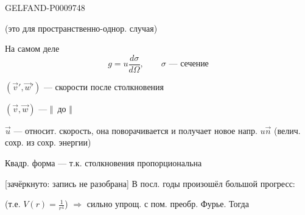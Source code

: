 \begin{GelfandAdjacentEvidence}{GELFAND-P000974}{8}


(это для пространственно-однор. случая)

На самом деле
\begin{equation*}
 g=u\frac{d\sigma}{d\Omega},\qquad
 \sigma\text{ --- сечение}
 \tag{4}
\end{equation*}

$(\vec v',\vec w')$ --- скорости после столкновения

$(\vec v,\vec w)$ --- \textemdash\(\Vert\)\textemdash\ до \textemdash\(\Vert\)\textemdash

$\vec u$ --- относит. скорость, она поворачивается и получает новое напр. $u\vec n$ (велич. сохр. из сохр. энергии)

Квадр. форма --- т.к.  столкновения пропорциональна

[зачёркнуто: запись не разобрана] В посл. годы произошёл большой прогресс: 
\end{GelfandAdjacentEvidence}


(т.е. $V(r)=\frac{1}{r^4}$) $\Rightarrow$ сильно упрощ. с пом. преобр. Фурье. Тогда

